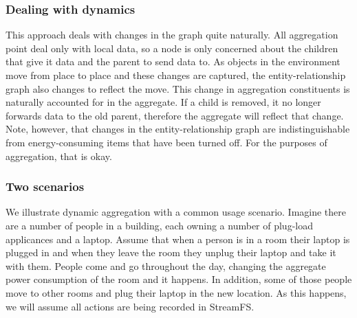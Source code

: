 \subsubsection{Dealing with dynamics}
This approach deals with changes in the graph quite naturally.  All aggregation point deal only with local data, so
a node is only concerned about the children that give it data and the parent to send data to.  As objects in the environment
move from place to place and these changes are captured, the entity-relationship graph also changes to reflect the move.
This change in aggregation constituents is naturally accounted for in the aggregate.  If a child is removed,
it no longer forwards data to the old parent, therefore the aggregate will reflect that change.
Note, however, that changes in the entity-relationship graph are indistinguishable from energy-consuming items that have
been turned off.  For the purposes of aggregation, that is okay.

\subsubsection{Two scenarios}
We illustrate dynamic aggregation with a common usage scenario.  Imagine there are a number of people in a building,
each owning a number of plug-load applicances and a laptop.  Assume that when a person is in a room their laptop
is plugged in and when they leave the room they unplug their laptop and take it with them.  People come and go
throughout the day, changing the aggregate power consumption of the room and it happens.  In addition, some
of those people move to other rooms and plug their laptop in the new location.  As this happens, we will assume
all actions are being recorded in StreamFS.

